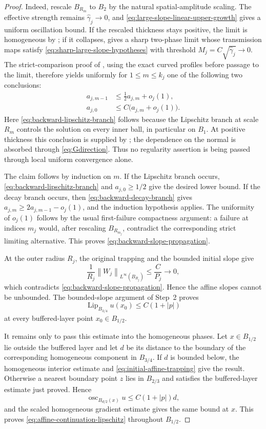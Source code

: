 \documentclass[11pt,letterpaper]{amsart}
\numberwithin{equation}{section}
\DeclareMathOperator{\osc}{osc}
\DeclareMathOperator{\Lip}{Lip}
\newcommand{\norm}[1]{\left\lVert #1\right\rVert}
\theoremstyle{definition}
\theoremstyle{remark}
\begin{document}
\begin{proof}
Indeed, rescale $B_{R_m}$ to $B_2$ by the natural spatial-amplitude
scaling.  The effective strength remains
$\widehat\gamma_j\to0$, and
\eqref{eq:large-slope-linear-upper-growth} gives a uniform oscillation
bound.  If the rescaled thickness stays positive, the limit is homogeneous
by ; if it collapses,
 gives a sharp two-phase limit whose transmission
maps satisfy \eqref{eq:sharp-large-slope-hypotheses} with threshold
$M_j=C\sqrt{\widehat\gamma_j}\to0$.  The strict-comparison proof of
, using the exact curved profiles before
passage to the limit, therefore yields uniformly for $1\leq m\leq k_j$ one
of the following two conclusions:
\begin{align}
a_{j,m-1}
&\leq \frac12a_{j,m}+o_j(1),
\label{eq:backward-decay-branch}
\\
a_{j,0}
&\leq C\bigl(a_{j,m}+o_j(1)\bigr).
\label{eq:backward-lipschitz-branch}
\end{align}
Here \eqref{eq:backward-lipschitz-branch} follows because the Lipschitz
branch at scale $R_m$ controls the solution on every inner ball, in
particular on $B_1$.  At positive thickness this conclusion is supplied by
; the dependence on the normal is
absorbed through \eqref{eq:Gdirection}.  Thus no regularity assertion is
being passed through local uniform convergence alone.

The claim follows by induction on $m$.  If the Lipschitz branch occurs,
\eqref{eq:backward-lipschitz-branch} and $a_{j,0}\geq1/2$ give the desired
lower bound.  If the decay branch occurs, then
\eqref{eq:backward-decay-branch} gives
$a_{j,m}\geq2a_{j,m-1}-o_j(1)$, and the induction hypothesis applies.
The uniformity of $o_j(1)$ follows by the usual first-failure compactness
argument: a failure at indices $m_j$ would, after rescaling
$B_{R_{m_j}}$, contradict the corresponding strict limiting alternative.
This proves \eqref{eq:backward-slope-propagation}.

At the outer radius $R_j$, the original trapping and the bounded initial
slope give
$$
\frac1{R_j}
\norm{W_j}_{L^\infty(B_{R_j})}
\leq
\frac{C}{P_j}
\longrightarrow0,
$$
which contradicts \eqref{eq:backward-slope-propagation}. Hence the affine
slopes cannot be unbounded. The bounded-slope argument of Step~2 proves
$$
\Lip_{B_{3/4}}u(x_0)
\leq C(1+|p|)
$$
at every buffered-layer point $x_0\in B_{1/2}$.

It remains only to pass this estimate into the homogeneous phases.  Let
$x\in B_{1/2}$ lie outside the buffered layer and let $d$ be its distance to
the boundary of the corresponding homogeneous component in $B_{3/4}$.  If
$d$ is bounded below, the homogeneous interior estimate and
\eqref{eq:initial-affine-trapping} give the result.  Otherwise a nearest
boundary point $z$ lies in $B_{2/3}$ and satisfies the buffered-layer
estimate just proved.  Hence
$$
\osc_{B_{d/2}(x)}u
\leq C(1+|p|)d,
$$
and the scaled homogeneous gradient estimate gives the same bound at $x$.
This proves \eqref{eq:affine-continuation-lipschitz} throughout $B_{1/2}$.
\end{proof}
\end{document}
